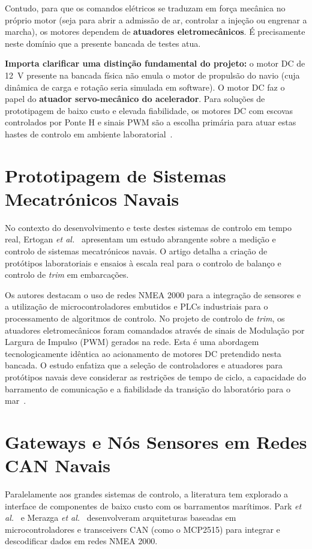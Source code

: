 Contudo, para que os comandos elétricos se traduzam em força mecânica no próprio motor (seja para abrir a admissão de ar, controlar a injeção ou engrenar a marcha), os motores dependem de \textbf{atuadores eletromecânicos}. É precisamente neste domínio que a presente bancada de testes atua. 

\textbf{Importa clarificar uma distinção fundamental do projeto:} o motor DC de 12~V presente na bancada física não emula o motor de propulsão do navio (cuja dinâmica de carga e rotação seria simulada em software). O motor DC faz o papel do \textbf{atuador servo-mecânico do acelerador}. Para soluções de prototipagem de baixo custo e elevada fiabilidade, os motores DC com escovas controlados por Ponte H e sinais PWM são a escolha primária para atuar estas hastes de controlo em ambiente laboratorial~\cite{ertogan2018marine}.

\section{Prototipagem de Sistemas Mecatrónicos Navais}
No contexto do desenvolvimento e teste destes sistemas de controlo em tempo real, Ertogan \textit{et al.}~\cite{ertogan2018marine} apresentam um estudo abrangente sobre a medição e controlo de sistemas mecatrónicos navais. O artigo detalha a criação de protótipos laboratoriais e ensaios à escala real para o controlo de balanço e controlo de \textit{trim} em embarcações. 

Os autores destacam o uso de redes NMEA 2000 para a integração de sensores e a utilização de microcontroladores embutidos e PLCs industriais para o processamento de algoritmos de controlo. No projeto de controlo de \textit{trim}, os atuadores eletromecânicos foram comandados através de sinais de Modulação por Largura de Impulso (PWM) gerados na rede. Esta é uma abordagem tecnologicamente idêntica ao acionamento de motores DC pretendido nesta bancada. O estudo enfatiza que a seleção de controladores e atuadores para protótipos navais deve considerar as restrições de tempo de ciclo, a capacidade do barramento de comunicação e a fiabilidade da transição do laboratório para o mar~\cite{ertogan2018marine}.

\section{Gateways e Nós Sensores em Redes CAN Navais}
Paralelamente aos grandes sistemas de controlo, a literatura tem explorado a interface de componentes de baixo custo com os barramentos marítimos. Park \textit{et al.}~\cite{park2011design} e Merazga \textit{et al.}~\cite{merazga2021nmea} desenvolveram arquiteturas baseadas em microcontroladores e transceivers CAN (como o MCP2515) para integrar e descodificar dados em redes NMEA 2000. 

